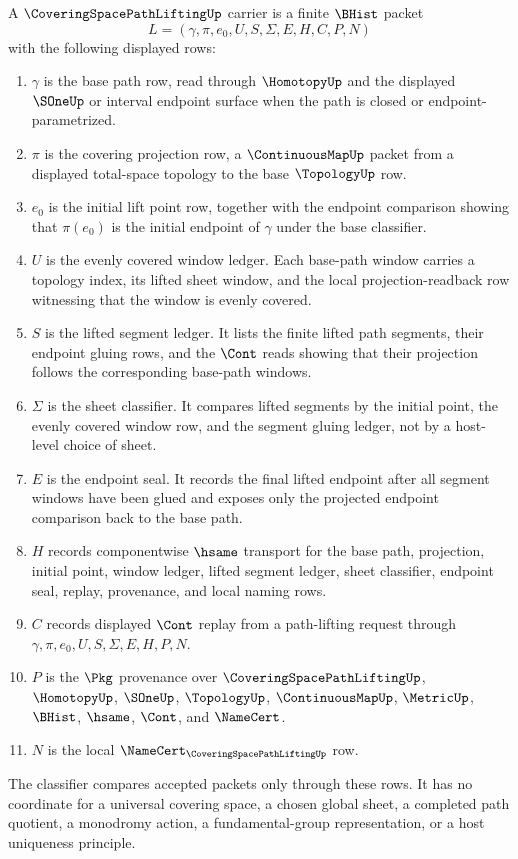 \begin{definition}
\label{def:covering-space-path-lifting-carrier}
A $\CoveringSpacePathLiftingUp$ carrier is a finite $\BHist$ packet
$$
L=(\gamma,\pi,e_0,U,S,\Sigma,E,H,C,P,N)
$$
with the following displayed rows:
\begin{enumerate}
\item $\gamma$ is the base path row, read through $\HomotopyUp$ and the displayed $\SOneUp$ or interval endpoint surface when the path is closed or endpoint-parametrized.
\item $\pi$ is the covering projection row, a $\ContinuousMapUp$ packet from a displayed total-space topology to the base $\TopologyUp$ row.
\item $e_0$ is the initial lift point row, together with the endpoint comparison showing that $\pi(e_0)$ is the initial endpoint of $\gamma$ under the base classifier.
\item $U$ is the evenly covered window ledger. Each base-path window carries a topology index, its lifted sheet window, and the local projection-readback row witnessing that the window is evenly covered.
\item $S$ is the lifted segment ledger. It lists the finite lifted path segments, their endpoint gluing rows, and the $\Cont$ reads showing that their projection follows the corresponding base-path windows.
\item $\Sigma$ is the sheet classifier. It compares lifted segments by the initial point, the evenly covered window row, and the segment gluing ledger, not by a host-level choice of sheet.
\item $E$ is the endpoint seal. It records the final lifted endpoint after all segment windows have been glued and exposes only the projected endpoint comparison back to the base path.
\item $H$ records componentwise $\hsame$ transport for the base path, projection, initial point, window ledger, lifted segment ledger, sheet classifier, endpoint seal, replay, provenance, and local naming rows.
\item $C$ records displayed $\Cont$ replay from a path-lifting request through $\gamma,\pi,e_0,U,S,\Sigma,E,H,P,N$.
\item $P$ is the $\Pkg$ provenance over $\CoveringSpacePathLiftingUp$, $\HomotopyUp$, $\SOneUp$, $\TopologyUp$, $\ContinuousMapUp$, $\MetricUp$, $\BHist$, $\hsame$, $\Cont$, and $\NameCert$.
\item $N$ is the local $\NameCert_{\CoveringSpacePathLiftingUp}$ row.
\end{enumerate}
The classifier compares accepted packets only through these rows. It has no coordinate for a universal covering space, a chosen global sheet, a completed path quotient, a monodromy action, a fundamental-group representation, or a host uniqueness principle.
\end{definition}

